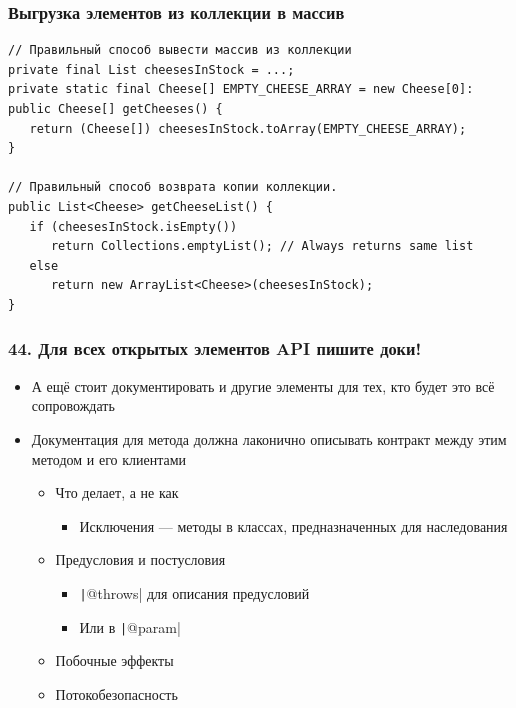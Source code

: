 \documentclass[xetex,mathserif,serif]{beamer}
\begin{document}
	\begin{frame}[fragile]
		\frametitle{Выгрузка элементов из коллекции в массив}
		\begin{small}
			\begin{verbatim}
// Правильный способ вывести массив из коллекции
private final List cheesesInStock = ...;
private static final Cheese[] EMPTY_CHEESE_ARRAY = new Cheese[0]:
public Cheese[] getCheeses() {
   return (Cheese[]) cheesesInStock.toArray(EMPTY_CHEESE_ARRAY);
}

// Правильный способ возврата копии коллекции.
public List<Cheese> getCheeseList() {
   if (cheesesInStock.isEmpty())  
      return Collections.emptyList(); // Always returns same list
   else 
      return new ArrayList<Cheese>(cheesesInStock);
}
			\end{verbatim}
		\end{small}
	\end{frame}

	\begin{frame}
		\frametitle{44. Для всех открытых элементов API пишите доки!}
		\begin{itemize}
			\item А ещё стоит документировать и другие элементы для тех, кто будет это всё сопровождать
			\item Документация для метода должна лаконично описывать контракт между этим методом и его клиентами
			\begin{itemize}
				\item Что делает, а не как
				\begin{itemize}
					\item Исключения --- методы в классах, предназначенных для наследования
				\end{itemize}
				\item Предусловия и постусловия
				\begin{itemize}
					\item \texttt|@throws| для описания предусловий
					\item Или в \texttt|@param|
				\end{itemize}
				\item Побочные эффекты
				\item Потокобезопасность
			\end{itemize}
		\end{itemize}
	\end{frame}
\end{document}
